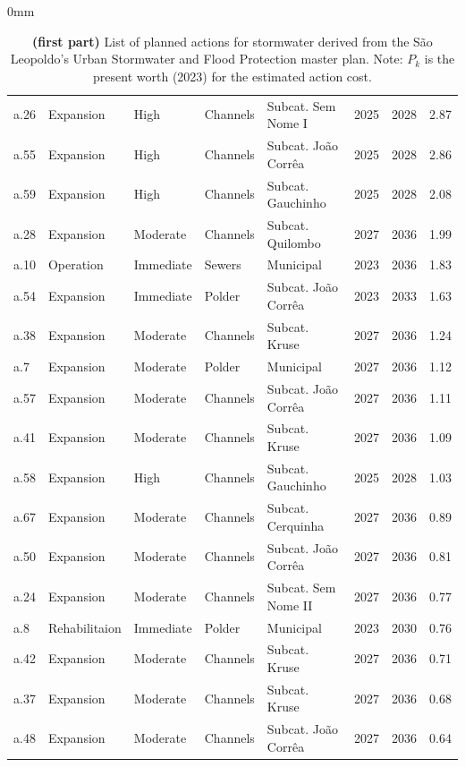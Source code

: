 \documentclass[./main.tex]{subfiles}
\begin{document}
\begin{adjustwidth}{\bodytab}{0mm}
\begin{table}[t]
\begin{tabular}{lllllrrr}
a.26 &     Expansion &      High & Channels &  Subcat. Sem Nome I &   2025 & 2028 &  2.87 \\
a.55 &     Expansion &      High & Channels & Subcat. João Corrêa &   2025 & 2028 &  2.86 \\
a.59 &     Expansion &      High & Channels &   Subcat. Gauchinho &   2025 & 2028 &  2.08 \\
a.28 &     Expansion &  Moderate & Channels &    Subcat. Quilombo &   2027 & 2036 &  1.99 \\
a.10 &     Operation & Immediate &   Sewers &           Municipal &   2023 & 2036 &  1.83 \\
a.54 &     Expansion & Immediate &   Polder & Subcat. João Corrêa &   2023 & 2033 &  1.63 \\
a.38 &     Expansion &  Moderate & Channels &       Subcat. Kruse &   2027 & 2036 &  1.24 \\
 a.7 &     Expansion &  Moderate &   Polder &           Municipal &   2027 & 2036 &  1.12 \\
a.57 &     Expansion &  Moderate & Channels & Subcat. João Corrêa &   2027 & 2036 &  1.11 \\
a.41 &     Expansion &  Moderate & Channels &       Subcat. Kruse &   2027 & 2036 &  1.09 \\
a.58 &     Expansion &      High & Channels &   Subcat. Gauchinho &   2025 & 2028 &  1.03 \\
a.67 &     Expansion &  Moderate & Channels &   Subcat. Cerquinha &   2027 & 2036 &  0.89 \\
a.50 &     Expansion &  Moderate & Channels & Subcat. João Corrêa &   2027 & 2036 &  0.81 \\
a.24 &     Expansion &  Moderate & Channels & Subcat. Sem Nome II &   2027 & 2036 &  0.77 \\
 a.8 & Rehabilitaion & Immediate &   Polder &           Municipal &   2023 & 2030 &  0.76 \\
a.42 &     Expansion &  Moderate & Channels &       Subcat. Kruse &   2027 & 2036 &  0.71 \\
a.37 &     Expansion &  Moderate & Channels &       Subcat. Kruse &   2027 & 2036 &  0.68 \\
a.48 &     Expansion &  Moderate & Channels & Subcat. João Corrêa &   2027 & 2036 &  0.64 \\
\bottomrule
\end{tabular}
\caption[Uma Tabela bem grande]{\textbf{(first part)} List of planned actions for stormwater derived from the São Leopoldo's Urban Stormwater and Flood Protection master plan. Note: $P_k$ is the present worth (2023) for the estimated action cost.}
\label{tab:actions_1}
\end{table}


\end{adjustwidth}
\end{document}
